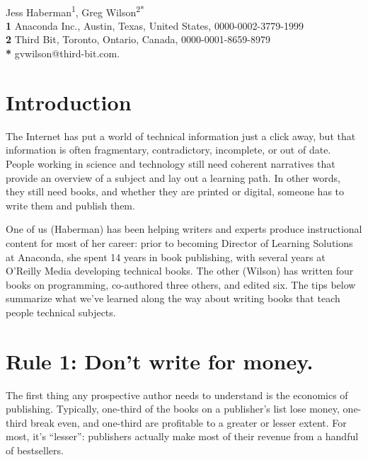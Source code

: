 \documentclass[10pt,letterpaper]{article}
\begin{document}
\vspace*{0.2in}

\begin{flushleft}
{\Large
\textbf{}
}
\newline
\\
{Jess Haberman}\textsuperscript{1},
{Greg Wilson}\textsuperscript{2*}
\\
\bigskip
\textbf{1} Anaconda Inc., Austin, Texas, United States, 0000-0002-3779-1999\\
\textbf{2} Third Bit, Toronto, Ontario, Canada, 0000-0001-8659-8979\\
\textbf{*} gvwilson@third-bit.com.
\end{flushleft}

\section*{Introduction}

The Internet has put a world of technical information just a click
away, but that information is often fragmentary, contradictory,
incomplete, or out of date. People working in science and technology
still need coherent narratives that provide an overview of a subject
and lay out a learning path. In other words, they still need books,
and whether they are printed or digital, someone has to write them and
publish them.

One of us (Haberman) has been helping writers and experts produce
instructional content for most of her career: prior to becoming Director
of Learning Solutions at Anaconda, she spent 14 years in book
publishing, with several years at O'Reilly Media developing technical
books. The other (Wilson) has written four books on
programming, co-authored three others, and edited six. The tips below
summarize what we've learned along the way about writing books that
teach people technical subjects.

\section*{Rule 1: Don't write for money.}

The first thing any prospective author needs to understand is the
economics of publishing. Typically, one-third of the books on a
publisher's list lose money, one-third break even, and one-third are
profitable to a greater or lesser extent. For most, it's ``lesser'':
publishers actually make most of their revenue from a handful of
bestsellers.
\end{document}
